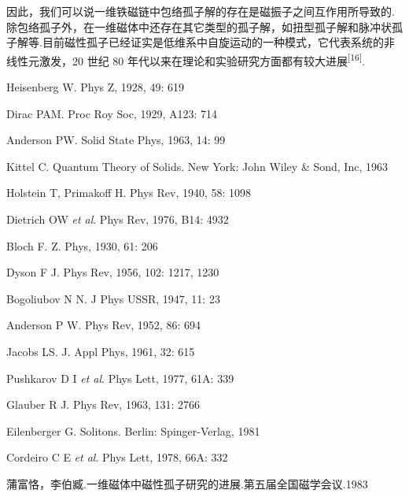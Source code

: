 因此，我们可以说一维铁磁链中包络孤子解的存在是磁振子之间互作用所导致的.除包络孤子外，在一维磁体中还存在其它类型的孤子解，如扭型孤子解和脉冲状孤子解等.目前磁性孤子已经证实是低维系中自旋运动的一种模式，它代表系统的非线性元激发，20
世纪 80
年代以来在理论和实验研究方面都有较大进展\textsuperscript{[16]}.

\begin{canKao}
\begin{enumerate}[label={[\arabic*]}, leftmargin=2.2em, itemsep=0pt]
\item Heisenberg W. Phys Z, 1928, 49: 619
\item Dirac PAM. Proc Roy Soc, 1929, A123: 714
\item Anderson PW. Solid State Phys, 1963, 14: 99
\item Kittel C. Quantum Theory of Solids. New York: John Wiley \& Sond, Inc, 1963
\item Holstein T, Primakoff H. Phys Rev, 1940, 58: 1098
\item Dietrich OW {\it et al}. Phys Rev, 1976, B14: 4932
\item Bloch F. Z. Phys, 1930, 61: 206
\item Dyson F J. Phys Rev, 1956, 102: 1217, 1230
\item Bogoliubov N N. J Phys USSR, 1947, 11: 23
\item Anderson P W. Phys Rev, 1952, 86: 694
\item Jacobs LS. J. Appl Phys, 1961, 32: 615
\item Pushkarov D I {\it et al}. Phys Lett, 1977, 61A: 339
\item Glauber R J. Phys Rev, 1963, 131: 2766
\item Eilenberger G. Solitons. Berlin: Spinger-Verlag, 1981
\item Cordeiro C E {\it et al}. Phys Lett, 1978, 66A: 332
\item 蒲富恪，李伯臧.一维磁体中磁性孤子研究的进展.第五届全国磁学会议.1983
\end{enumerate}
\end{canKao}
